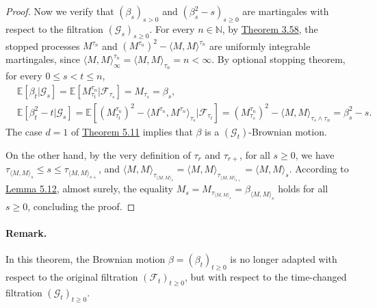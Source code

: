\documentclass{article}
\numberwithin{equation}{section}
\newcommand{\E}{\mathbb{E}}
\theoremstyle{plain}
\theoremstyle{definition}
\begin{document}
\begin{proof}
Now we verify that $(\beta_s)_{s>0}$ and $(\beta_s^2-s)_{s\geq 0}$ are martingales with respect to the filtration $(\mathscr{G}_s)_{s\geq 0}$. For every $n\in\mathbb{N}$, by \hyperref[thm:3.58]{Theorem 3.58}, the stopped processes $M^{\tau_n}$ and $(M^{\tau_n})^2-\langle M,M\rangle^{\tau_n}$ are uniformly integrable martingales, since $\langle M,M\rangle^{\tau_n}_\infty=\langle M,M\rangle_{\tau_n}=n<\infty$. By optional stopping theorem, for every $0\leq s<t\leq n$,
\begin{align*}
	&\E\left[\beta_t|\mathscr{G}_s\right] = \E\left[M^{\tau_n}_{\tau_t}|\mathscr{F}_{\tau_s}\right] = M_{\tau_s}=\beta_s,\\
	&\E\left[\beta_t^2-t|\mathscr{G}_s\right] = \E\left[(M_{\tau_t}^{\tau_n})^2-\langle M^{\tau_n},M^{\tau_n}\rangle_{\tau_s}|\mathscr{F}_{\tau_t}\right] = (M_{\tau_s}^{\tau_n})^2-\langle M,M\rangle_{\tau_s\wedge\tau_n} = \beta_s^2-s.
\end{align*}
The case $d=1$ of \hyperref[thm:5.11]{Theorem 5.11} implies that $\beta$ is a $(\mathscr{G}_t)$-Brownian motion.

On the other hand, by the very definition of $\tau_r$ and $\tau_{r+}$, for all $s\geq 0$, we have $\tau_{\langle M,M\rangle_s}\leq s\leq\tau_{\langle M,M\rangle_{s+}}$, and $\langle M,M\rangle_{\tau_{\langle M,M\rangle_s}}=\langle M,M\rangle_{\tau_{\langle M,M\rangle_{s+}}}=\langle M,M\rangle_s$. According to \hyperref[lemma:5.12]{Lemma 5.12}, almost surely, the equality $M_s=M_{\tau_{\langle M,M\rangle_s}}=\beta_{\langle M,M\rangle_s}$ holds for all $s\geq 0$, concluding the proof.
\end{proof}
\paragraph{Remark.} In this theorem, the Brownian motion $\beta=(\beta_t)_{t\geq 0}$ is no longer adapted with respect to the original filtration $(\mathscr{F}_t)_{t\geq 0}$, but with respect to the time-changed filtration $(\mathscr{G}_t)_{t\geq 0}$.
\end{document}
